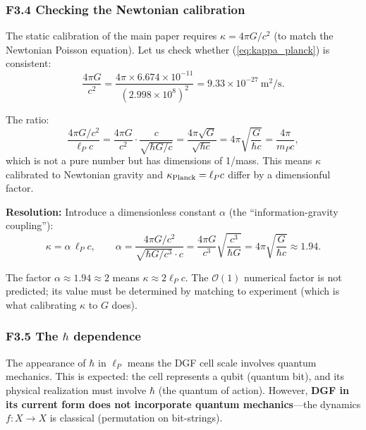 \documentclass[reprint]{revtex4-2}
\begin{document}
\subsubsection{F3.4 Checking the Newtonian calibration}

The static calibration of the main paper requires $\kappa = 4\pi G/c^2$ (to match the Newtonian Poisson equation). Let us check whether (\ref{eq:kappa_planck}) is consistent:
\begin{equation}
\frac{4\pi G}{c^2} = \frac{4\pi \times 6.674\times 10^{-11}}{(2.998\times 10^8)^2} = 9.33\times 10^{-27}~\text{m}^2/\text{s}.
\end{equation}

The ratio:
\begin{equation}
\frac{4\pi G/c^2}{\ell_P c} = \frac{4\pi G}{c^2}\cdot\frac{c}{\sqrt{\hbar G/c}} = \frac{4\pi\sqrt{G}}{\sqrt{\hbar c}} = 4\pi\sqrt{\frac{G}{\hbar c}} = \frac{4\pi}{m_P c},
\end{equation}
which is not a pure number but has dimensions of 1/mass. This means $\kappa$ calibrated to Newtonian gravity and $\kappa_{\rm Planck} = \ell_P c$ differ by a dimensionful factor.

\textbf{Resolution:} Introduce a dimensionless constant $\alpha$ (the ``information-gravity coupling''):
\begin{equation}
\kappa = \alpha\,\ell_P c, \qquad \alpha = \frac{4\pi G/c^2}{\sqrt{\hbar G/c^3}\cdot c} = \frac{4\pi G}{c^3}\sqrt{\frac{c^3}{\hbar G}} = 4\pi\sqrt{\frac{G}{\hbar c}} \approx 1.94.
\end{equation}

The factor $\alpha \approx 1.94 \approx 2$ means $\kappa \approx 2\ell_P c$. The $\mathcal{O}(1)$ numerical factor is not predicted; its value must be determined by matching to experiment (which is what calibrating $\kappa$ to $G$ does).

\subsubsection{F3.5 The $\hbar$ dependence}

The appearance of $\hbar$ in $\ell_P$ means the DGF cell scale involves quantum mechanics. This is expected: the cell represents a qubit (quantum bit), and its physical realization must involve $\hbar$ (the quantum of action). However, \textbf{DGF in its current form does not incorporate quantum mechanics}---the dynamics $f:X\to X$ is classical (permutation on bit-strings).
\end{document}
